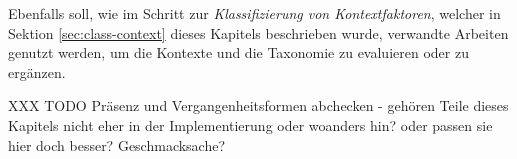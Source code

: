 Ebenfalls soll, wie im Schritt zur \textit{Klassifizierung von Kontextfaktoren}, welcher in Sektion \ref{sec:class-context} dieses Kapitels beschrieben wurde, verwandte Arbeiten genutzt werden, um die Kontexte und die Taxonomie zu evaluieren oder zu ergänzen.




XXX TODO Präsenz und Vergangenheitsformen abchecken - gehören Teile dieses Kapitels nicht eher in der Implementierung oder woanders hin? oder passen sie hier doch besser? Geschmacksache? \\ 